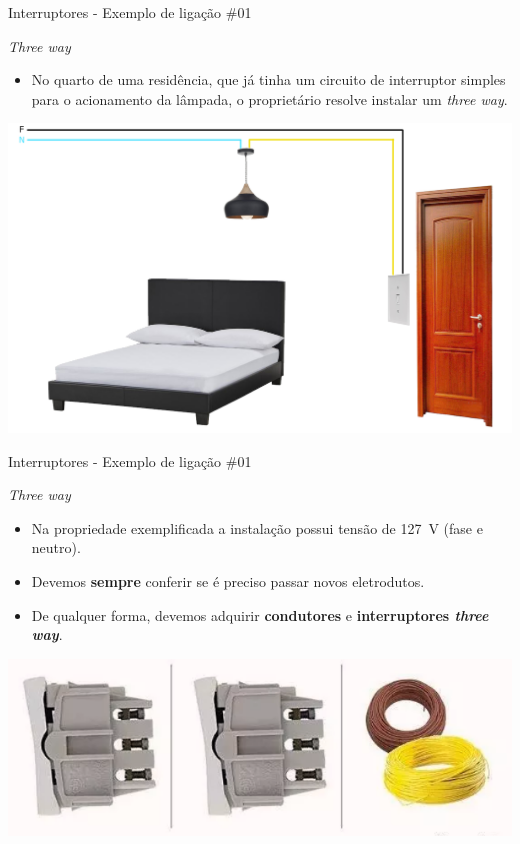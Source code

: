 \begin{frame}{Interruptores - Exemplo de ligação \#01}
	\begin{block}{\textit{Three way}}
		\begin{itemize}
			\item No quarto de uma residência, que já tinha um circuito de interruptor simples para o acionamento da lâmpada, o proprietário resolve instalar um \textit{three way}.
		\end{itemize}
	\end{block}

	\medskip

	\centering
	\includegraphics[width=0.7\linewidth]{Figuras/Ch08/fig16.1}
\end{frame}


\begin{frame}{Interruptores - Exemplo de ligação \#01}
	\begin{block}{\textit{Three way}}
		\begin{itemize}
			\item Na propriedade exemplificada a instalação possui tensão de \SI{127}{\volt} (fase e neutro).
			\item Devemos \textbf{sempre} conferir se é preciso passar novos eletrodutos.
			\item De qualquer forma, devemos adquirir \textbf{condutores} e \textbf{interruptores \textit{three way}}.
		\end{itemize}
	\end{block}

	\bigskip

	\centering
	\includegraphics[width=0.7\linewidth]{Figuras/Ch08/fig17}
\end{frame}


